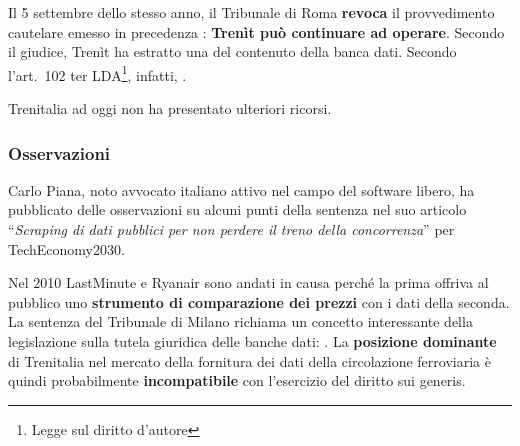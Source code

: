 \documentclass[12pt,italian]{report}
\begin{document}
Il 5 settembre dello stesso anno, il Tribunale di Roma \textbf{revoca}
il provvedimento cautelare emesso in precedenza \cite{TrenitSentenza}:
\textbf{Trenìt può continuare ad operare}.  Secondo il giudice, Trenìt
ha estratto una  del
contenuto della banca dati.  Secondo l'art.\ 102 ter
LDA\footnote{Legge sul diritto d'autore}, infatti,
.

Trenitalia ad oggi non ha presentato ulteriori ricorsi.

\subsubsection{Osservazioni}

Carlo Piana, noto avvocato italiano attivo nel campo del software
libero, ha pubblicato delle osservazioni su alcuni punti della
sentenza nel suo articolo ``\textit{Scraping di dati pubblici per non
    perdere il treno della concorrenza}'' \cite{TrenitPiana} per
TechEconomy2030.

Nel 2010 LastMinute e Ryanair sono andati in causa perché la prima
offriva al pubblico uno \textbf{strumento di comparazione dei prezzi}
con i dati della seconda.  La sentenza \cite{RyanairSentenza} del
Tribunale di Milano richiama un concetto interessante della
legislazione sulla tutela giuridica delle banche dati:
.  La
\textbf{posizione dominante} di Trenitalia nel mercato della fornitura
dei dati della circolazione ferroviaria è quindi probabilmente
\textbf{incompatibile} con l'esercizio del diritto sui generis.
\end{document}
